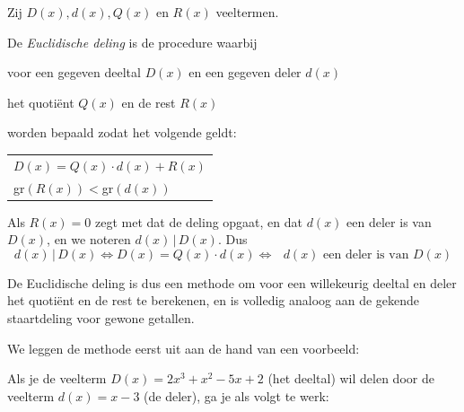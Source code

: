 \documentclass{ximera}
\begin{document}
\begin{definition}
    Zij $D(x),d(x), Q(x)$ en $R(x)$ veeltermen.
    
    De \textit{Euclidische deling} is de procedure waarbij 
    
    voor een gegeven deeltal $D(x)$ en een gegeven deler $d(x)$ 
    
    het quotiënt $Q(x)$ en de rest $R(x)$
    
     worden bepaald zodat het volgende
    geldt:
    
    \begin{tabular}{l}
        $D(x) = Q(x)\cdot d(x) + R(x)$ \\
        gr$(R(x)) < $gr$(d(x))$
    \end{tabular}

    Als $R(x)=0$ zegt met dat de deling opgaat, en dat $d(x)$ een deler is van $D(x)$, en we noteren $d(x)\,|\,D(x)$. Dus
    $$
     d(x)\,|\,D(x) \iff D(x)=Q(x)\cdot d(x) \iff\text{ $d(x)$ een deler is van $D(x)$}
    $$
    
\end{definition}
De Euclidische deling is dus een methode om voor een willekeurig deeltal en deler het quotiënt en de rest te berekenen, en is volledig analoog aan de gekende staartdeling voor gewone getallen.


We leggen de methode eerst uit aan de hand van een voorbeeld:

Als je de veelterm $D(x) = 2x^3+x^2-5x+2$ (het deeltal) wil
delen door de veelterm $d(x) = x-3$ (de deler), ga je als volgt te werk:
\end{document}
